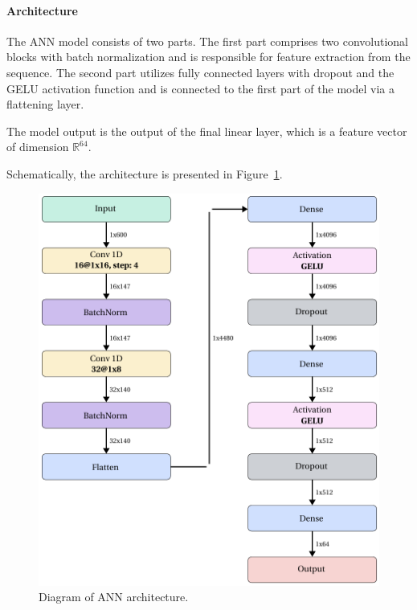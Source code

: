 \documentclass[pdflatex,sn-vancouver-num]{sn-jnl}%
\begin{document}
                \paragraph{Architecture}
                The ANN model consists of two parts. The first part comprises two convolutional blocks with batch normalization and is responsible for feature extraction from the sequence. The second part utilizes fully connected layers with dropout and the GELU activation function \cite{Hendrycks:2016} and is connected to the first part of the model via a flattening layer.

                The model output is the output of the final linear layer, which is a feature vector of dimension \( \mathbb{R}^{64} \).

                Schematically, the architecture is presented in Figure~\ref{Picture:NeuralModel}.

                \begin{figure}[!htb]
                    \begin{center}
                        \includegraphics[width=\textwidth]{picture_ann_network.png}
                    \end{center}
                    \caption{
                        Diagram of ANN architecture.
                    }\label{Picture:NeuralModel}
                \end{figure}
\end{document}
